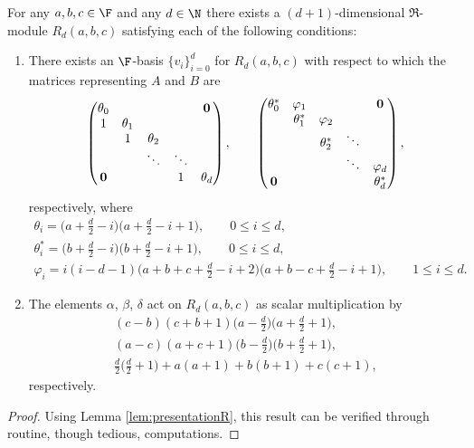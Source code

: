 \begin{Proposition}\label{prop:Rd}For any $a,b,c\in \F$ and any $d\in \N$ there exists a $(d+1)$-dimensional $\Re$-module $R_d(a,b,c)$ satisfying each of the following conditions:
\begin{enumerate}\itemsep=0pt
\item[$(i)$] There exists an $\F$-basis $\{v_i\}_{i=0}^d$ for $R_d(a,b,c)$ with respect to which the matrices represen\-ting $A$ and $B$ are
\begin{gather*}
\begin{pmatrix}
\theta_0 & & & &{\bf 0}
\\
1 &\theta_1
\\
&1 &\theta_2
 \\
& &\ddots &\ddots
 \\
{\bf 0} & & &1 &\theta_d
\end{pmatrix},
\qquad
\begin{pmatrix}
\theta_0^* &\varphi_1 & & &{\bf 0}
\\
 &\theta_1^* &\varphi_2
\\
 & &\theta_2^* &\ddots
 \\
 & & &\ddots &\varphi_d
 \\
{\bf 0} & & & &\theta_d^*
\end{pmatrix},
\end{gather*}
respectively, where
\begin{gather*}
\theta_i=\big(a+\textstyle\frac{d}{2}-i\big) \big(a+\textstyle\frac{d}{2}-i+1\big), \qquad 0\leq i\leq d,\\
\theta^*_i=\big(b+\textstyle\frac{d}{2}-i\big)\big(b+\textstyle\frac{d}{2}-i+1\big), \qquad 0\leq i\leq d,
\\
\varphi_i=i(i-d-1)\big(a+b+c+\textstyle\frac{d}{2}-i+2\big)\big(a+b-c+\textstyle\frac{d}{2}-i+1\big),
\qquad 1\leq i\leq d.
\end{gather*}

\item[$(ii)$] The elements $\alpha$, $\beta$, $\delta$ act on $R_d (a,b,c)$ as scalar multiplication by
\begin{gather*}
(c-b)(c+b+1)\big(a-\textstyle\frac{d}{2}\big)\big(a+\textstyle\frac{d}{2}+1\big),\\
(a-c)(a+c+1)\big(b-\textstyle\frac{d}{2}\big)\big(b+\textstyle\frac{d}{2}+1\big),\\
\textstyle\frac{d}{2} \big(\textstyle\frac{d}{2}+1\big)+a(a+1)+b(b+1)+c(c+1),
\end{gather*}
respectively.
\end{enumerate}
\end{Proposition}
\begin{proof} Using Lemma \ref{lem:presentationR}, this result can be verified through routine, though tedious, computations.
\end{proof}
